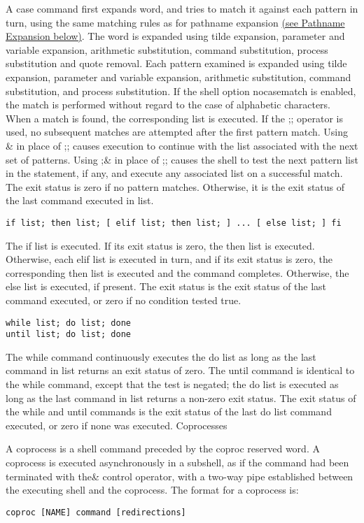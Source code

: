 A case command first expands word, and tries to match it against each pattern in turn, using the same matching rules as for pathname expansion \hyperref[sec:pathnameexpansion]{(see Pathname Expansion below)}. The word is expanded using tilde expansion, parameter and variable expansion, arithmetic substitution, command substitution, process substitution and quote removal. Each pattern examined is expanded using tilde expansion, parameter and variable expansion, arithmetic substitution, command substitution, and process substitution. If the shell option nocasematch is enabled, the match is performed without regard to the case of alphabetic characters. When a match is found, the corresponding list is executed. If the ;; operator is used, no subsequent matches are attempted after the first pattern match. Using \& in place of ;; causes execution to continue with the list associated with the next set of patterns. Using ;\& in place of ;; causes the shell to test the next pattern list in the statement, if any, and execute any associated list on a successful match. The exit status is zero if no pattern matches. Otherwise, it is the exit status of the last command executed in list.
\begin{lstlisting}
if list; then list; [ elif list; then list; ] ... [ else list; ] fi
\end{lstlisting}\label{lst:if}

The if list is executed. If its exit status is zero, the then list is executed. Otherwise, each elif list is executed in turn, and if its exit status is zero, the corresponding then list is executed and the command completes. Otherwise, the else list is executed, if present. The exit status is the exit status of the last command executed, or zero if no condition tested true.
\begin{lstlisting}
while list; do list; done
until list; do list; done
\end{lstlisting}
The while command continuously executes the do list as long as the last command in list returns an exit status of zero. The until command is identical to the while command, except that the test is negated; the do list is executed as long as the last command in list returns a non-zero exit status. The exit status of the while and until commands is the exit status of the last do list command executed, or zero if none was executed.
Coprocesses

A coprocess is a shell command preceded by the coproc reserved word. A coprocess is executed asynchronously in a subshell, as if the command had been terminated with the\& control operator, with a two-way pipe established between the executing shell and the coprocess.
The format for a coprocess is:
\begin{lstlisting}
coproc [NAME] command [redirections]
\end{lstlisting}

